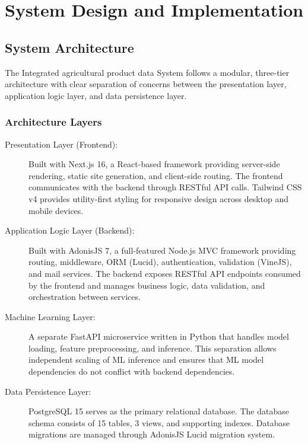 \section{System Design and Implementation}

\subsection{System Architecture}

The Integrated agricultural product data System follows a modular, three-tier architecture with clear separation of concerns between the presentation layer, application logic layer, and data persistence layer.

\subsubsection{Architecture Layers}

\begin{description}
  \item[Presentation Layer (Frontend):] Built with Next.js 16, a React-based framework providing server-side rendering, static site generation, and client-side routing. The frontend communicates with the backend through RESTful API calls. Tailwind CSS v4 provides utility-first styling for responsive design across desktop and mobile devices.
  
  \item[Application Logic Layer (Backend):] Built with AdonisJS 7, a full-featured Node.js MVC framework providing routing, middleware, ORM (Lucid), authentication, validation (VineJS), and mail services. The backend exposes RESTful API endpoints consumed by the frontend and manages business logic, data validation, and orchestration between services.
  
  \item[Machine Learning Layer:] A separate FastAPI microservice written in Python that handles model loading, feature preprocessing, and inference. This separation allows independent scaling of ML inference and ensures that ML model dependencies do not conflict with backend dependencies.
  
  \item[Data Persistence Layer:] PostgreSQL 15 serves as the primary relational database. The database schema consists of 15 tables, 3 views, and supporting indexes. Database migrations are managed through AdonisJS Lucid migration system.
\end{description}

